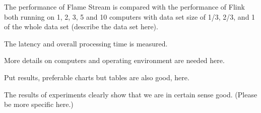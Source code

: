 
\label {fs-experiments-section}

The performance of Flame Stream is compared with the  performance of Flink both running on 1, 2, 3, 5 and 10 computers with data set size of 1/3, 2/3, and 1 of the whole data set  (describe the data set here).

The latency and overall processing time is measured. 

More details on computers and operating environment are needed here.

Put results, preferable charts but tables are also good, here.

The results of experiments clearly show that we are in certain sense good.  (Please be more specific here.)

